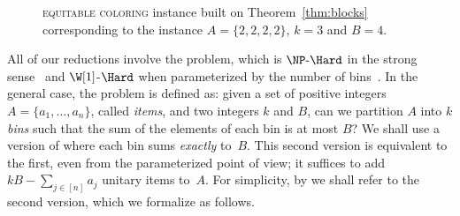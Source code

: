 \begin{figure}[!tb]
    
    \caption{\textsc{equitable coloring} instance built on Theorem~\ref{thm:blocks} corresponding to the  instance $A = \{2,2,2,2\}$, $k=3$ and $B = 4$.}
    \label{fig:super_flower}
\end{figure}

All of our reductions involve the  problem, which is $\NPH$ in the strong sense~\citep{garey_johnson} and $\W[1]$-$\Hard$ when parameterized by the number of bins~\citep{bin_packing_w1}.
In the general case, the problem is defined as: given a set of positive integers $A = \{a_1, \dots, a_n\}$, called \textit{items}, and two integers $k$ and $B$, can we partition $A$ into $k$ \emph{bins} such that the sum of the elements of each bin is at most $B$?
We shall use a version of  where each bin sums \emph{exactly} to~$B$.
This second version is equivalent to the first, even from the parameterized point of view; it suffices to add~$kB - \sum_{j \in [n]} a_j$ unitary items to~$A$.
For simplicity, by  we shall refer to the second version, which we formalize as follows.


